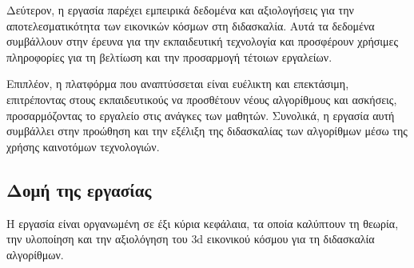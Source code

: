 Δεύτερον, η εργασία παρέχει εμπειρικά δεδομένα και αξιολογήσεις για την αποτελεσματικότητα των εικονικών κόσμων στη διδασκαλία. Αυτά τα δεδομένα συμβάλλουν στην έρευνα για την εκπαιδευτική τεχνολογία και προσφέρουν χρήσιμες πληροφορίες για τη βελτίωση και την προσαρμογή τέτοιων εργαλείων.

Επιπλέον, η πλατφόρμα που αναπτύσσεται είναι ευέλικτη και επεκτάσιμη, επιτρέποντας στους εκπαιδευτικούς να προσθέτουν νέους αλγορίθμους και ασκήσεις, προσαρμόζοντας το εργαλείο στις ανάγκες των μαθητών. Συνολικά, η εργασία αυτή συμβάλλει στην προώθηση και την εξέλιξη της διδασκαλίας των αλγορίθμων μέσω της χρήσης καινοτόμων τεχνολογιών.


\subsection{Δομή της εργασίας}

Η εργασία είναι οργανωμένη σε έξι κύρια κεφάλαια, τα οποία καλύπτουν τη θεωρία, την υλοποίηση και την αξιολόγηση του \acrshort{3d} εικονικού κόσμου για τη διδασκαλία αλγορίθμων.

